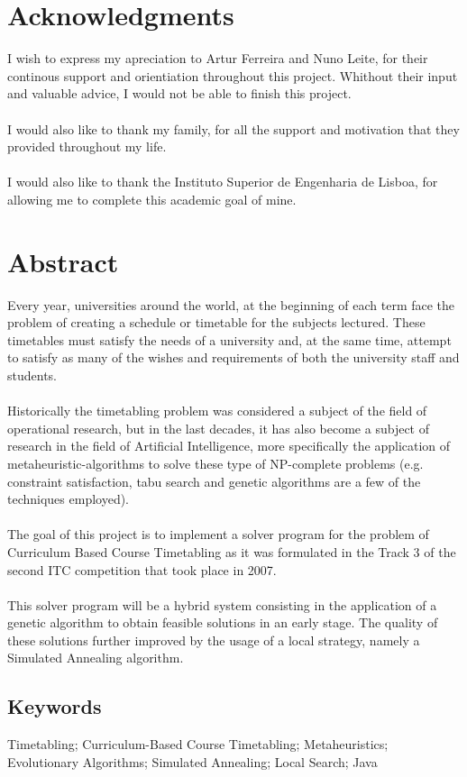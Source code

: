 \chapter*{Acknowledgments}
I wish to express my apreciation to Artur Ferreira and Nuno Leite, for their continous support and orientiation throughout this project. Whithout  their input and valuable advice, I would not be able to finish this project.\\
\\
I would also like to thank my family, for all the support and motivation that they provided throughout my life.\\
\\
I would also like to thank the Instituto Superior de Engenharia de Lisboa, for allowing me to complete this academic goal of mine.


\chapter*{Abstract}
Every year, universities around the world, at the beginning of each term face the problem of creating a schedule or timetable for the subjects lectured. These timetables must satisfy the needs of a university and, at the same time, attempt to satisfy as many of the wishes and requirements of both the university staff and students. \\
\\
Historically the timetabling problem was considered a subject of the field of operational research, but in the last decades, it has also become a subject of research in the field of Artificial Intelligence, more specifically the application of metaheuristic-algorithms to solve these type of NP-complete problems (e.g. constraint satisfaction, tabu search and genetic algorithms are a few of the techniques employed). \\
\\
The goal of this project is to implement a solver program for the problem of Curriculum Based Course Timetabling as it was formulated in the Track 3 of the second ITC competition that took place in 2007.\\
\\
This solver program will be a hybrid system consisting in the application of a genetic algorithm to obtain feasible solutions in an early stage. The quality of these solutions further improved by the usage of a local strategy, namely a Simulated Annealing algorithm. 

\section*{Keywords}
Timetabling; Curriculum-Based Course Timetabling; Metaheuristics; Evolutionary Algorithms; Simulated Annealing; Local Search; Java 
